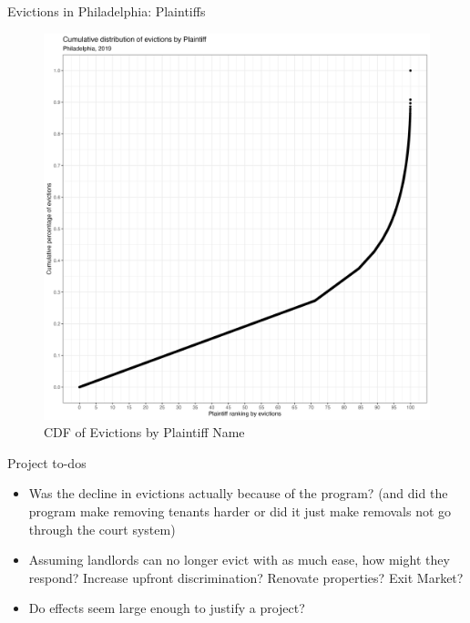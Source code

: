 \documentclass[10pt, xcolor=dvipsnames]{beamer}
\begin{document}
\begin{frame}{Evictions in Philadelphia: Plaintiffs}
\begin{figure}
    \centering
    \includegraphics[width=0.6\linewidth]{figs/cumulative_evict_dist_plaintiff_hist.png}
    \caption{CDF of Evictions by Plaintiff Name}
    \label{fig:cdf-plaintiff}
\end{figure}
    
\end{frame}

\begin{frame}{Project to-dos}
\begin{itemize}
    \item Was the decline in evictions actually because of the program? (and did the program make removing tenants harder or did it just make removals not go through the court system)
    \item Assuming landlords can no longer evict with as much ease, how might they respond? Increase upfront discrimination? Renovate properties? Exit Market?
    \item Do effects seem large enough to justify a project?
\end{itemize}
    
\end{frame}
\end{document}
